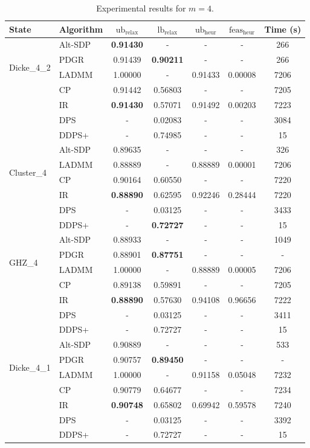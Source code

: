 \documentclass[smallextended]{svjour3}
\newcommand{\1}{\mathbf{1}}
\newcommand{\heur}{\text{heur}}
\newcommand{\relx}{\text{relax}}
\newcommand{\lb}{\text{lb}}
\newcommand{\ub}{\text{ub}}
\newcommand{\feas}{\text{feas}}
\begin{document}
\begin{table}[htb]
\centering
\begin{tabular}{l|l|ccccc}
        \textbf{State} & \textbf{Algorithm} & $\ub_{\relx}$ & $\lb_{\relx}$ & $\ub_{\heur}$ & $\feas_{\heur}$ & \textbf{Time (s)} \\
\toprule
 \multirow{4}{*}{Dicke\_4\_2}
& Alt-SDP & \textbf{0.91430} & - & - & - & 266 \\
& PDGR & 0.91439  & \textbf{0.90211} & - & - & 266 \\
 & LADMM & 1.00000 & - & 0.91433 & 0.00008 & 7206 \\
 & CP & 0.91442 & 0.56803 & - & - & 7205 \\
 & IR & \textbf{0.91430} & 0.57071 & 0.91492 & 0.00203 & 7223 \\
 & DPS & - & 0.02083 & - & - & 3084 \\
& DDPS+ & - & 0.74985 & - & - & 15 \\

\midrule
 \multirow{4}{*}{Cluster\_4}
& Alt-SDP & 0.89635 & - & - & - & 326 \\
 & LADMM & 0.88889 & - & 0.88889 & 0.00001 & 7206 \\
 & CP & 0.90164 & 0.60550 & - & - & 7220 \\
 & IR & \textbf{0.88890} & 0.62595 & 0.92246 & 0.28444 & 7220 \\
 & DPS & - & 0.03125 & - & - & 3433 \\
  & DDPS+ & - & \textbf{0.72727} & - & - & 15 \\


\midrule
 \multirow{4}{*}{GHZ\_4}
& Alt-SDP & 0.88933 & - & - & - & 1049 \\
& PDGR & 0.88901 &  \textbf{0.87751} & - & - & - \\
 & LADMM & 1.00000 & - & 0.88889 & 0.00005 & 7206 \\
 & CP & 0.89138 & 0.59891 & - & - & 7205 \\
 & IR & \textbf{0.88890} & 0.57630 & 0.94108 & 0.96656 & 7222 \\
 & DPS & - & 0.03125 & - & - & 3411 \\
 & DDPS+ & - & 0.72727 & - & - & 15 \\

\midrule
 \multirow{4}{*}{Dicke\_4\_1}
& Alt-SDP & 0.90889 & - & - & - & 533 \\
& PDGR &  0.90757 & \textbf{0.89450} & - & - & - \\
 & LADMM & 1.00000 & - & 0.91158 & 0.05048 & 7232 \\
 & CP & 0.90779 & 0.64677 & - & - & 7234 \\
 & IR & \textbf{0.90748} & 0.65802 & 0.69942 & 0.59578 & 7240 \\
 & DPS & - & 0.03125 & - & - & 3392 \\
 & DDPS+ & - &  0.72727 & - & - & 15 \\
\bottomrule


\end{tabular}
\caption{Experimental results for $m=4$.}
\label{tab.m4}
\end{table}
\end{document}
